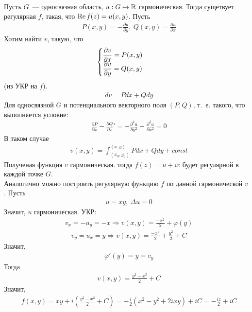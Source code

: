 \theorem
Пусть $G$~--- односвязная область, $u: G \mapsto \mathbb{R}$ гармоническая. Тогда
сущетвует регулярная $f$, такая, что $\mathrm{Re}\, f(z) = u(x,y)$.
\pr
Пусть
\begin{align*}
  & P(x,y) = -\frac{\partial u}{\partial y}, \ Q(x,y) = \frac{\partial u}{\partial x}
\end{align*}
Хотим найти $v$, такую, что
\begin{align*}
  & \begin{cases}
      \displaystyle \frac{\partial v}{\partial x} = P(x,y) \\
      \displaystyle \frac{\partial v}{\partial y} = Q(x,y) 
      \end{cases}
\end{align*}
(из УКР на $f$).
\begin{align*}
  & dv = Pdx+Qdy
\end{align*}
Для односвязной $G$ и потенциального векторного поля $(P,Q)$, т.~е. такого, что
выполняется условие:
\begin{align*}
  & \frac{\partial P}{\partial x} -\frac{\partial Q}{\partial x}' = - \frac{\partial^2 u}{\partial y^2} - \frac{\partial^2 u}{\partial x^2} = 0
\end{align*}
В таком случае
\begin{align*}
  & v(x,y) = \int_{(x_0,y_0)}^{(x,y)} P dx + Q dy + const
\end{align*}
Полученая функция $v$ гармоническая. тогда $f(z) = u+iv$ будет регулярной в
каждой точке $G$.
\\
Аналогично можно построить регулярную функцию $f$ по данной гармонической $v$.
\Example
Пусть
\begin{align*}
  & u = xy, \ \Delta u = 0
\end{align*}
Значит, $u$ гармоническая. УКР:
\begin{align*}
  & v_x = -u_y = -x \Rightarrow v(x,y) = \frac{-x^2}{2} + \varphi(y)
\end{align*}
\begin{align*}
  & v_y = u_x = y \Rightarrow v(x,y) = \frac{-x^2}{2} + \frac{y^2}{2} + C
\end{align*}
Значит,
\begin{align*}
  & \varphi'(y) = y = v_y
\end{align*}
Тогда
\begin{align*}
  & v(x,y) = \frac{y^2-x^2}{2} + C
\end{align*}
Значит,
\begin{align*}
  & f(x,y)= xy+i\left( \frac{y^2-x^2}{2} + C \right) = -\frac{i}{2} \left( x^2-y^2+2ixy \right) + iC = -\frac{iz}{2} + iC
\end{align*}

